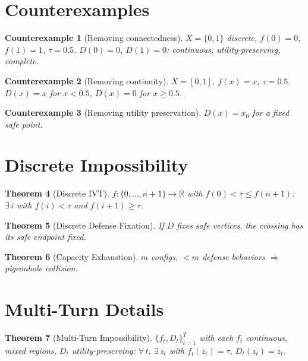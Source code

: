 \documentclass[11pt]{article}
\newtheorem{theorem}{Theorem}[section]
\newtheorem{counterexample}[theorem]{Counterexample}
\newcommand{\R}{\mathbb{R}}
\begin{document}

\appendix

\section{Counterexamples}
\label{sec:counterexamples-app}

\begin{counterexample}[Removing connectedness]
$X = \{0,1\}$ discrete, $f(0)=0$, $f(1)=1$, $\tau=0.5$. $D(0)=0$, $D(1)=0$: continuous, utility-preserving, complete.
\end{counterexample}

\begin{counterexample}[Removing continuity]
$X=[0,1]$, $f(x)=x$, $\tau=0.5$. $D(x)=x$ for $x<0.5$, $D(x)=0$ for $x \geq 0.5$.
\end{counterexample}

\begin{counterexample}[Removing utility preservation]
$D(x) = x_0$ for a fixed safe point.
\end{counterexample}

\section{Discrete Impossibility}
\label{sec:discrete-app}

\begin{theorem}[Discrete IVT]
$f\colon \{0,\ldots,n+1\} \to \R$ with $f(0) < \tau \leq f(n+1)$: $\exists\, i$ with $f(i) < \tau$ and $f(i+1) \geq \tau$.
\end{theorem}

\begin{theorem}[Discrete Defense Fixation]
If $D$ fixes safe vertices, the crossing has its safe endpoint fixed.
\end{theorem}

\begin{theorem}[Capacity Exhaustion]
$m$ configs, $< m$ defense behaviors $\Rightarrow$ pigeonhole collision.
\end{theorem}

\section{Multi-Turn Details}
\label{sec:multi-turn-app}

\begin{theorem}[Multi-Turn Impossibility]
\label{thm:multi-turn-app}
$\{f_t, D_t\}_{t=1}^T$ with each $f_t$ continuous, mixed regions, $D_t$ utility-preserving: $\forall\, t$, $\exists\, z_t$ with $f_t(z_t) = \tau$, $D_t(z_t) = z_t$.
\end{theorem}
\end{document}
